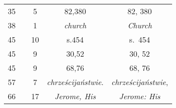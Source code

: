 \documentclass[a4paper,11pt]{article}
\begin{document}
\begin{center}
\begin{tabular}{|c|c|c|c|c|}
    \hphantom{0}35 & & \hphantom{0}5 & 82,380 & 82, 380 \\
    \hphantom{0}38 & & \hphantom{0}1 & \textit{church} & \textit{Church} \\
    \hphantom{0}45 & & 10 & s.454 & s.~454 \\
    \hphantom{0}45 & & \hphantom{0}9 & 30,52 & 30, 52 \\
    \hphantom{0}45 & & \hphantom{0}9 & 68,76 & 68, 76 \\
    \hphantom{0}57 & & \hphantom{0}7 & \textit{chrześcijaństwie}.
    & \textit{chrześcijaństwie}, \\
    \hphantom{0}66 & & 17 & \textit{Jerome, His} & \textit{Jerome: His} \\
    \hline
  \end{tabular}





  \newpage


\end{center}
\end{document}
